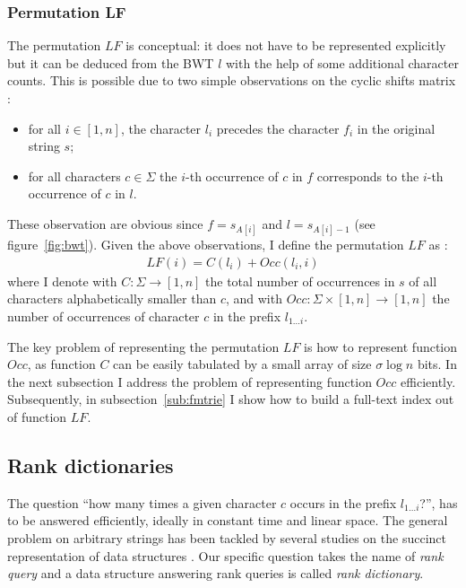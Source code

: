 \subsubsection{Permutation LF}

The permutation $LF$ is conceptual: it does not have to be represented explicitly but it can be deduced from the BWT $l$ with the help of some additional character counts.
This is possible due to two simple observations on the cyclic shifts matrix \citep{Burrows1994}:
\begin{itemize}
\item for all $i \in [1,n]$, the character $l_i$ precedes the character $f_i$ in the original string $s$;%
\item for all characters $c \in \Sigma$ the $i$-th occurrence of $c$ in $f$ corresponds to the $i$-th occurrence of $c$ in $l$.
\end{itemize}
These observation are obvious since $f = s_{A[i]}$ and $l = s_{A[i] - 1}$ (see figure~\ref{fig:bwt}).
Given the above observations, I define the permutation $LF$ as \citep{Burrows1994,Ferragina2000}:
\begin{eqnarray}
LF(i) = C(l_i) + Occ(l_i, i)
\end{eqnarray}
where I denote with $C : \Sigma \rightarrow [1,n]$ the total number of occurrences in $s$ of all characters alphabetically smaller than $c$, and with $Occ :  \Sigma \times [1,n] \rightarrow [1,n]$ the number of occurrences of character $c$ in the prefix $l_{1 \dots i}$.

The key problem of representing the permutation $LF$ is how to represent function $Occ$, as function $C$ can be easily tabulated by a small array of size $\sigma \log{n}$ bits.
In the next subsection I address the problem of representing function $Occ$ efficiently. Subsequently, in subsection~\ref{sub:fmtrie} I show how to build a full-text index out of function $LF$.

\subsection{Rank dictionaries}

The question ``how many times a given character $c$ occurs in the prefix $l_{1 \dots i}$?'', has to be answered efficiently, ideally in constant time and linear space.
The general problem on arbitrary strings has been tackled by several studies on the succinct representation of data structures \citep{Jacobson1989}.
Our specific question takes the name of \emph{rank query} and a data structure answering rank queries is called \emph{rank dictionary}.

